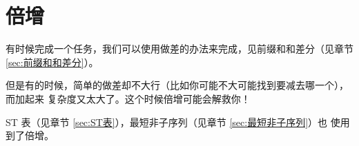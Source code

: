 \section{倍增} \label{sec:倍增}
有时候完成一个任务，我们可以使用做差的办法来完成，见前缀和和差分（见章节
\ref{sec:前缀和和差分}）。

但是有的时候，简单的做差却不大行（比如你可能不大可能找到要减去哪一个），而加起来
复杂度又太大了。这个时候倍增可能会解救你！

ST 表（见章节 \ref{sec:ST表}），最短非子序列（见章节 \ref{sec:最短非子序列}）也
使用到了倍增。
